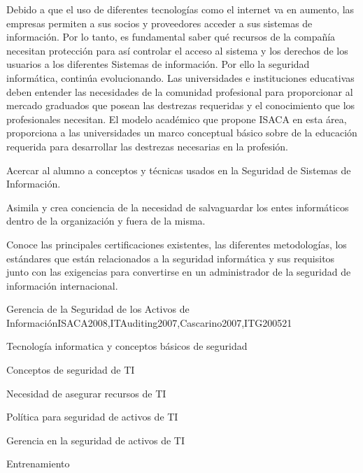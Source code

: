 \begin{syllabus}
\begin{justification}
Debido a que el uso de diferentes tecnologías como el internet va en aumento, las empresas permiten a sus socios y proveedores acceder a sus sistemas de información. Por lo tanto, es fundamental saber qué recursos de la compañía necesitan protección para así­ controlar el acceso al sistema y los derechos de los usuarios a los diferentes Sistemas de información.  Por ello la seguridad informática, continúa evolucionando. Las universidades e instituciones educativas deben entender las necesidades de la comunidad profesional para proporcionar al mercado graduados que posean las destrezas requeridas y el conocimiento que los profesionales necesitan. El modelo académico que propone  ISACA en esta área, proporciona a las universidades un marco conceptual básico sobre de la educación requerida para desarrollar las destrezas necesarias en la profesión.
\end{justification}

\begin{goals}
\item Acercar al alumno a conceptos y técnicas usados en la Seguridad de Sistemas de Información.
\item Asimila y crea conciencia de la necesidad de salvaguardar los entes informáticos dentro de la organización y fuera de la misma.
\item Conoce las principales certificaciones existentes, las diferentes metodologías, los estándares que están relacionados a la seguridad informática y sus requisitos junto con las exigencias para convertirse en un administrador de la seguridad de información internacional.
\end{goals}

\begin{outcomes}
\end{outcomes}

\begin{unit}{Gerencia de la Seguridad de los Activos de Información}{ISACA2008,ITAuditing2007,Cascarino2007,ITG2005}{2}{1}
\begin{topics}
\item Tecnología informatica y conceptos básicos de seguridad
\item Conceptos de seguridad de TI 
\item Necesidad de asegurar recursos de TI
\item Política para seguridad de activos de TI 
\item Gerencia en la seguridad de activos de TI 
\item Entrenamiento
\end{topics}


\end{unit}
\end{syllabus}
